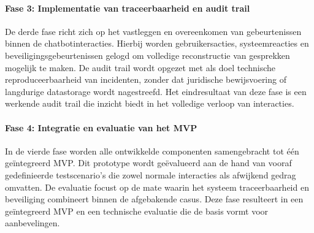 \paragraph{Fase 3: Implementatie van traceerbaarheid en audit trail}
De derde fase richt zich op het vastleggen en overeenkomen van gebeurtenissen binnen de chatbotinteracties. Hierbij worden gebruikersacties, systeemreacties en beveiligingsgebeurtenissen gelogd om volledige reconstructie van gesprekken mogelijk te maken. De audit trail wordt opgezet met als doel technische reproduceerbaarheid van incidenten, zonder dat juridische bewijsvoering of langdurige datastorage wordt nagestreefd. Het eindresultaat van deze fase is een werkende audit trail die inzicht biedt in het volledige verloop van interacties.

\paragraph{Fase 4: Integratie en evaluatie van het MVP}
In de vierde fase worden alle ontwikkelde componenten samengebracht tot één geïntegreerd MVP. Dit prototype wordt geëvalueerd aan de hand van vooraf gedefinieerde testscenario’s die zowel normale interacties als afwijkend gedrag omvatten. De evaluatie focust op de mate waarin het systeem traceerbaarheid en beveiliging combineert binnen de afgebakende casus. Deze fase resulteert in een geïntegreerd MVP en een technische evaluatie die de basis vormt voor aanbevelingen.

